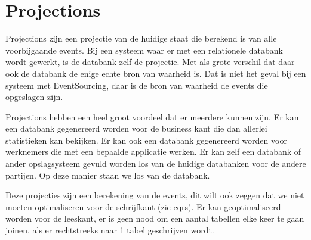 
\section{Projections}
\label{sec:projections}

Projections zijn een projectie van de huidige staat die berekend is van alle voorbijgaande events. Bij een systeem waar er met een relationele databank wordt gewerkt, is de databank zelf de projectie. Met als grote verschil dat daar ook de databank de enige echte bron van waarheid is. Dat is niet het geval bij een systeem met EventSourcing, daar is de bron van waarheid de events die opgeslagen zijn.

Projections hebben een heel groot voordeel dat er meerdere kunnen zijn. Er kan een databank gegenereerd worden voor de business kant die dan allerlei statistieken kan bekijken. Er kan ook een databank gegenereerd worden voor werknemers die met een bepaalde applicatie werken. Er kan zelf een databank of ander opslagsysteem gevuld worden los van de huidige databanken voor de andere partijen. Op deze manier staan we los van de databank.

Deze projecties zijn een berekening van de events, dit wilt ook zeggen dat we niet moeten optimaliseren voor de schrijfkant (zie cqrs). Er kan geoptimaliseerd worden voor de leeskant, er is geen nood om een aantal tabellen elke keer te gaan joinen, als er rechtstreeks naar 1 tabel geschrijven wordt.